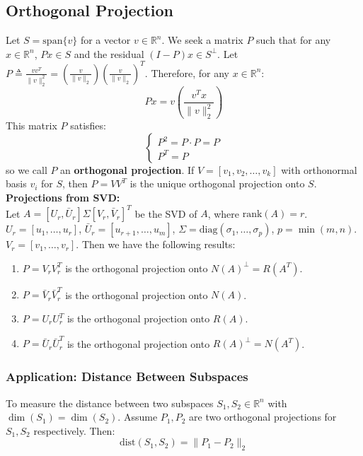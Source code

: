 \documentclass[12pt, a4paper]{article}
\theoremstyle{break}
\begin{document}
\subsection{Orthogonal Projection}
Let $S = \text{span}\{v\}$ for a vector $v \in \mathbb{R}^n$.
We seek a matrix $P$ such that for any $x \in \mathbb{R}^n$, $Px \in S$ and the residual $(I - P)x \in S^\perp$.
Let $P \triangleq \frac{v v^T}{\|v\|_2^2} = \left(\frac{v}{\|v\|_2}\right) \left(\frac{v}{\|v\|_2}\right)^T$. Therefore, for any $x \in \mathbb{R}^n$:
\begin{equation*}
    Px = v \left( \frac{v^T x}{\|v\|_2^2} \right)
\end{equation*}
This matrix $P$ satisfies:
\begin{equation*}
    \begin{cases} 
    P^2 = P \cdot P = P \\ 
    P^T = P 
    \end{cases}
\end{equation*}
so we call $P$ an \textbf{orthogonal projection}.
If $V = [v_1, v_2, \dots, v_k]$ with orthonormal basis $v_i$ for $S$, then $P = V V^T$ is the unique orthogonal projection onto $S$.
\vspace{0.3cm}
\noindent \textbf{Projections from SVD:} \\
Let $A = [U_r, \bar{U}_r] \Sigma [V_r, \bar{V}_r]^T$ be the SVD of $A$, where $\text{rank}(A) = r$.
$U_r = [u_1, \dots, u_r]$, $\bar{U}_r = [u_{r+1}, \dots, u_m]$, $\Sigma = \text{diag}(\sigma_1, \dots, \sigma_p)$, $p = \min(m,n)$.
$V_r = [v_1, \dots, v_r]$.
Then we have the following results:
\begin{enumerate}
    \item $P = V_r V_r^T$ is the orthogonal projection onto $N(A)^\perp = R(A^T)$.
    \item $P = \bar{V}_r \bar{V}_r^T$ is the orthogonal projection onto $N(A)$.
    \item $P = U_r U_r^T$ is the orthogonal projection onto $R(A)$.
    \item $P = \bar{U}_r \bar{U}_r^T$ is the orthogonal projection onto $R(A)^\perp = N(A^T)$.
\end{enumerate}

\subsubsection*{Application: Distance Between Subspaces}
To measure the distance between two subspaces $S_1, S_2 \in \mathbb{R}^n$ with $\dim(S_1) = \dim(S_2)$.
Assume $P_1, P_2$ are two orthogonal projections for $S_1, S_2$ respectively.
Then:
\begin{equation*}
    \text{dist}(S_1, S_2) = \|P_1 - P_2\|_2
\end{equation*}
\end{document}
